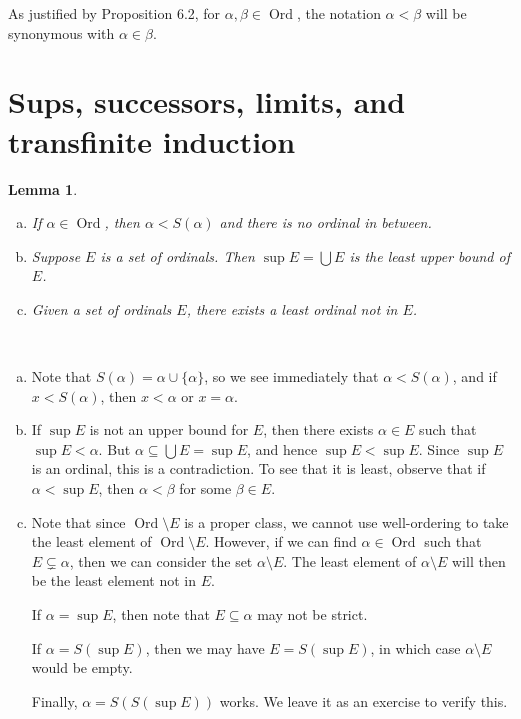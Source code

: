 \documentclass[10pt]{article}
\makeatletter
\DeclareMathOperator{\Ord}{Ord}
\theoremstyle{newstyle}
\newtheorem{lemma}[thm]{Lemma}
\newenvironment{pf}[1][\proofname]{\par
  \pushQED{\qed}%
  \normalfont \topsep0\p@\relax
  \trivlist
  \item[\hskip\labelsep\scshape
  #1\@addpunct{.}]\ignorespaces
}{%
  \popQED\endtrivlist\@endpefalse
}
\makeatother
\begin{document}
As justified by Proposition 6.2, for $\alpha, \beta \in \Ord$, the notation 
$\alpha < \beta$ will be synonymous with $\alpha \in \beta$. 

%  
\newpage\section{Sups, successors, limits, and transfinite induction}

\begin{lemma}~
\begin{enumerate}[(a)]
    \item If $\alpha \in \Ord$, then $\alpha < S(\alpha)$ and there is no ordinal in between. 
    \item Suppose $E$ is a set of ordinals. Then $\sup E = \bigcup E$ is the least upper bound of $E$.
    \item Given a set of ordinals $E$, there exists a least ordinal not in $E$.
\end{enumerate} 
\end{lemma}
\begin{pf}~ 
\begin{enumerate}[(a)]
    \item Note that $S(\alpha) = \alpha \cup \{\alpha\}$, so we see immediately that $\alpha < 
    S(\alpha)$, and if $x < S(\alpha)$, then $x < \alpha$ or $x = \alpha$. 
    \item If $\sup E$ is not an upper bound for $E$, then there exists $\alpha \in E$ such that 
    $\sup E < \alpha$. But $\alpha \subseteq \bigcup E = \sup E$, and hence 
    $\sup E < \sup E$. Since $\sup E$ is an ordinal, this is a contradiction. 
    To see that it is least, observe that if $\alpha < \sup E$, then $\alpha < \beta$ for some 
    $\beta \in E$.
    \item Note that since $\Ord \setminus E$ is a proper class, we cannot use well-ordering 
    to take the least element of $\Ord \setminus E$. However, if we can find $\alpha \in \Ord$ 
    such that $E \subsetneq \alpha$, then we can consider the set $\alpha \setminus E$. 
    The least element of $\alpha \setminus E$ will then be the least element not in $E$. 
    
    If $\alpha = \sup E$, then note that $E \subseteq \alpha$ may not be strict. 
    
    If $\alpha = S(\sup E)$, then we may have $E = S(\sup E)$, in which case $\alpha \setminus E$ 
    would be empty.
    
    Finally, $\alpha = S(S(\sup E))$ works. We leave it as an exercise to verify this. \qedhere
\end{enumerate}
\end{pf}
\end{document}

